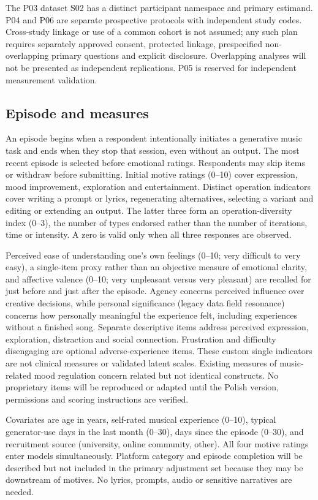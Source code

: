 \documentclass[11pt,a4paper]{article}
\begin{document}
The P03 dataset S02 has a distinct participant namespace and primary estimand. P04 and P06 are separate prospective protocols with independent study codes. Cross-study linkage or use of a common cohort is not assumed; any such plan requires separately approved consent, protected linkage, prespecified non-overlapping primary questions and explicit disclosure. Overlapping analyses will not be presented as independent replications. P05 is reserved for independent measurement validation.

\subsection{Episode and measures}
An episode begins when a respondent intentionally initiates a generative music task and ends when they stop that session, even without an output. The most recent episode is selected before emotional ratings. Respondents may skip items or withdraw before submitting. Initial motive ratings (0--10) cover expression, mood improvement, exploration and entertainment. Distinct operation indicators cover writing a prompt or lyrics, regenerating alternatives, selecting a variant and editing or extending an output. The latter three form an operation-diversity index (0--3), the number of types endorsed rather than the number of iterations, time or intensity. A zero is valid only when all three responses are observed.

Perceived ease of understanding one's own feelings (0--10; very difficult to very easy), a single-item proxy rather than an objective measure of emotional clarity, and affective valence (0--10; very unpleasant versus very pleasant) are recalled for just before and just after the episode. Agency concerns perceived influence over creative decisions, while personal significance (legacy data field resonance) concerns how personally meaningful the experience felt, including experiences without a finished song. Separate descriptive items address perceived expression, exploration, distraction and social connection. Frustration and difficulty disengaging are optional adverse-experience items. These custom single indicators are not clinical measures or validated latent scales. Existing measures of music-related mood regulation \parencite{saarikallio2008} concern related but not identical constructs. No proprietary items will be reproduced or adapted until the Polish version, permissions and scoring instructions are verified.

Covariates are age in years, self-rated musical experience (0--10), typical generator-use days in the last month (0--30), days since the episode (0--30), and recruitment source (university, online community, other). All four motive ratings enter models simultaneously. Platform category and episode completion will be described but not included in the primary adjustment set because they may be downstream of motives. No lyrics, prompts, audio or sensitive narratives are needed.
\end{document}
